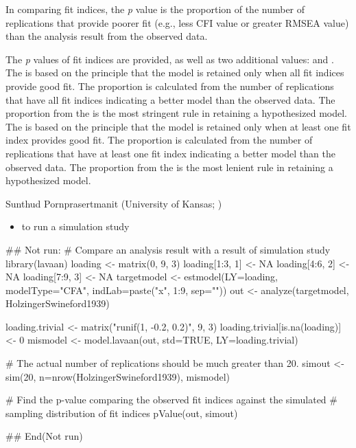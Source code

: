 \documentclass[a4paper]{book}
\begin{document}
%
\begin{Details}\relax
In comparing fit indices, the \emph{p} value is the proportion of the number of replications that provide poorer fit (e.g., less CFI value or greater RMSEA value) than the analysis result from the observed data. 
\end{Details}
%
\begin{Value}
The \emph{p} values of fit indices are provided, as well as two additional values:  and . The  is based on the principle that the model is retained only when all fit indices provide good fit. The proportion is calculated from the number of replications that have all fit indices indicating a better model than the observed data. The proportion from the  is the most stringent rule in retaining a hypothesized model. The  is based on the principle that the model is retained only when at least one fit index provides good fit. The proportion is calculated from the number of replications that have at least one fit index indicating a better model than the observed data. The proportion from the  is the most lenient rule in retaining a hypothesized model.
\end{Value}
%
\begin{Author}\relax
Sunthud Pornprasertmanit (University of Kansas; )
\end{Author}
%
\begin{SeeAlso}\relax
\begin{itemize}

\item {} to run a simulation study

\end{itemize}

\end{SeeAlso}
%
\begin{Examples}
\begin{ExampleCode}
## Not run: 
# Compare an analysis result with a result of simulation study
library(lavaan)
loading <- matrix(0, 9, 3)
loading[1:3, 1] <- NA
loading[4:6, 2] <- NA
loading[7:9, 3] <- NA
targetmodel <- estmodel(LY=loading, modelType="CFA", indLab=paste("x", 1:9, sep=""))
out <- analyze(targetmodel, HolzingerSwineford1939)

loading.trivial <- matrix("runif(1, -0.2, 0.2)", 9, 3)
loading.trivial[is.na(loading)] <- 0
mismodel <- model.lavaan(out, std=TRUE, LY=loading.trivial)

# The actual number of replications should be much greater than 20.
simout <- sim(20, n=nrow(HolzingerSwineford1939), mismodel)

# Find the p-value comparing the observed fit indices against the simulated 
# sampling distribution of fit indices
pValue(out, simout)

## End(Not run)
\end{ExampleCode}
\end{Examples}
\end{document}
